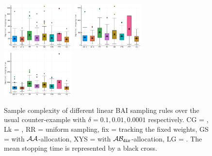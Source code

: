 \begin{figure}[t!]
 \centering
 \includegraphics[clip, width= 0.33\textwidth]{Chapter4/img/bai_sin_0-1}
 \includegraphics[clip, width= 0.33\textwidth]{Chapter4/img/bai_sin_0-01}
 \includegraphics[clip, width= 0.33\textwidth]{Chapter4/img/bai_sin_0-0001}
 \caption{Sample complexity of different linear BAI sampling rules over the usual counter-example with $\delta=0.1, 0.01, 0.0001$ respectively. CG = \LGC,  Lk = \LG, RR = uniform sampling, fix = tracking the fixed weights, GS = \XYS with $\mathcal{A}\mathcal{A}$-allocation, XYS = \XYS with $\mathcal{A}\mathcal{B}_{\texttt{dir}}$-allocation, LG = \LGapE. The mean stopping time is represented by a black cross.}
 \label{fig:sample_complexity_1}
\end{figure}

